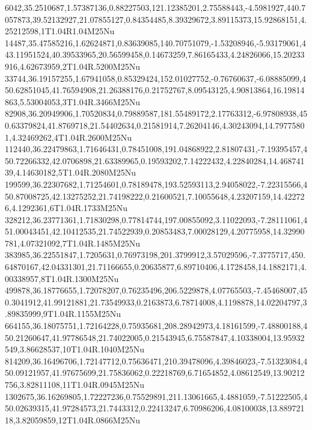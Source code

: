 6042,35.2510687,1.57387136,0.88227503,121.12385201,2.75588443,-4.5981927,440.7057873,39.52132927,21.07855127,0.84354485,8.39329672,3.89115373,15.92868151,4.25212598,1T1.04R1.04M25Nu
14487,35.47585216,1.62624871,0.83639085,140.70751079,-1.53208946,-5.93179061,443.11951524,40.39533965,20.56599458,0.14673259,7.86165433,4.24826066,15.20233916,4.62673959,2T1.04R.5200M25Nu
33744,36.19157255,1.67941058,0.85329424,152.01027752,-0.76760637,-6.08885099,450.62851045,41.76594908,21.26388176,0.21752767,8.09543125,4.90813864,16.19814863,5.53004053,3T1.04R.3466M25Nu
82908,36.20949906,1.70520834,0.79889587,181.55489172,2.17763312,-6.97808938,450.63379824,41.8769718,21.54402634,0.21581914,7.26204146,4.30243094,14.79775801,4.32469262,4T1.04R.2600M25Nu
112440,36.22479863,1.71646431,0.78451008,191.04868922,2.81807431,-7.19395457,450.72266332,42.0706898,21.63389965,0.19593202,7.14222432,4.22840284,14.46874139,4.14630182,5T1.04R.2080M25Nu
199599,36.22307682,1.71254601,0.78189478,193.52593113,2.94058022,-7.22315566,450.87008725,42.13275252,21.74198222,0.21600521,7.10055648,4.23207159,14.422726,4.1292361,6T1.04R.1733M25Nu
328212,36.23771361,1.71830298,0.77814744,197.00855092,3.11022093,-7.28111061,451.00043451,42.10412535,21.74522939,0.20853483,7.00028129,4.20775958,14.32990781,4.07321092,7T1.04R.1485M25Nu
383985,36.22551847,1.7205631,0.76973198,201.3799912,3.57029596,-7.3775717,450.64870167,42.04331301,21.71166655,0.20635877,6.89710406,4.1728458,14.1882171,4.00338957,8T1.04R.1300M25Nu
499878,36.18776655,1.72078207,0.76235496,206.5229878,4.07765503,-7.45468007,450.3041912,41.99121881,21.73549933,0.2163873,6.78714008,4.1198878,14.02204797,3.89835999,9T1.04R.1155M25Nu
664155,36.18075751,1.72164228,0.75935681,208.28942973,4.18161599,-7.48800188,450.21260647,41.97786548,21.74022005,0.21543945,6.75587847,4.10338004,13.95932549,3.86628537,10T1.04R.1040M25Nu
814209,36.16496706,1.72147712,0.75636471,210.39478096,4.39846023,-7.51323084,450.09121957,41.97675699,21.75836062,0.22218769,6.71654852,4.08612549,13.90212756,3.82811108,11T1.04R.0945M25Nu
1302675,36.16269805,1.72227236,0.75529891,211.13061665,4.4881059,-7.51222505,450.02639315,41.97284573,21.7443312,0.22413247,6.70986206,4.08100038,13.88972118,3.82059859,12T1.04R.0866M25Nu
